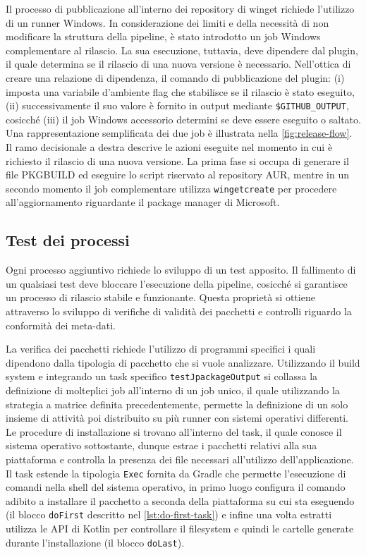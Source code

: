 Il processo di pubblicazione all'interno dei repository di winget richiede l'utilizzo di un runner Windows. In considerazione dei limiti e della necessità di non modificare la struttura della pipeline, è stato introdotto un job Windows complementare al rilascio. La sua esecuzione, tuttavia, deve dipendere dal plugin, il quale determina se il rilascio di una nuova versione è necessario. Nell'ottica di creare una relazione di dipendenza, il comando di pubblicazione del plugin: (i) imposta una variabile d'ambiente flag che stabilisce se il rilascio è stato eseguito, (ii) successivamente il suo valore è fornito in output mediante \texttt{\$GITHUB\_OUTPUT}, cosicché (iii) il job Windows accessorio determini se deve essere eseguito o saltato. Una rappresentazione semplificata dei due job è illustrata nella \cref{fig:release-flow}. Il ramo decisionale a destra descrive le azioni eseguite nel momento in cui è richiesto il rilascio di una nuova versione. La prima fase si occupa di generare il file PKGBUILD ed eseguire lo script riservato al repository AUR, mentre in un secondo momento il job complementare utilizza \texttt{wingetcreate} per procedere all'aggiornamento riguardante il package manager di Microsoft.

\subsection{Test dei processi}

Ogni processo aggiuntivo richiede lo sviluppo di un test apposito. Il fallimento di un qualsiasi test deve bloccare l'esecuzione della pipeline, cosicché si garantisce un processo di rilascio stabile e funzionante. Questa proprietà si ottiene attraverso lo sviluppo di verifiche di validità dei pacchetti e controlli riguardo la conformità dei meta-dati.

La verifica dei pacchetti richiede l'utilizzo di programmi specifici i quali dipendono dalla tipologia di pacchetto che si vuole analizzare. Utilizzando il build system e integrando un task specifico \texttt{testJpackageOutput} si collassa la definizione di molteplici job all'interno di un job unico, il quale utilizzando la strategia a matrice definita precedentemente, permette la definizione di un solo insieme di attività poi distribuito su più runner con sistemi operativi differenti. Le procedure di installazione si trovano all'interno del task, il quale conosce il sistema operativo sottostante, dunque estrae i pacchetti relativi alla sua piattaforma e controlla la presenza dei file necessari all'utilizzo dell'applicazione. Il task estende la tipologia \texttt{Exec} fornita da Gradle che permette l'esecuzione di comandi nella shell del sistema operativo, in primo luogo configura il comando adibito a installare il pacchetto a seconda della piattaforma su cui sta eseguendo (il blocco \texttt{doFirst} descritto nel \cref{lst:do-first-task}) e infine una volta estratti utilizza le API di Kotlin per controllare il filesystem e quindi le cartelle generate durante l'installazione (il blocco \texttt{doLast}).


